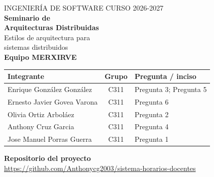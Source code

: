 \begin{titlepage}
\thispagestyle{empty}
\centering
{\color{gris}\small\MakeUppercase{Ingeniería de Software \textperiodcentered{} Curso 2026-2027}}\\[10mm]
{\color{azul}\Huge\bfseries Seminario de\\[2mm] Arquitecturas Distribuidas}\\[6mm]
{\large Estilos de arquitectura para\\ sistemas distribuidos}\\[16mm]
{\color{azul}\LARGE\bfseries Equipo MERXIRVE}\\[12mm]

\renewcommand{\arraystretch}{1.45}
\small
\begin{tabular}{@{}l c p{5.6cm}@{}}
\toprule
\textbf{Integrante} & \textbf{Grupo} & \textbf{Pregunta / inciso} \\
\midrule
Enrique González González   & C311 & Pregunta 3; Pregunta 5 \\
Ernesto Javier Govea Varona & C311 & Pregunta 6 \\
Olivia Ortiz Arboláez       & C311 & Pregunta 2 \\
Anthony Cruz Garcia         & C311 & Pregunta 4 \\
Jose Manuel Porras Guerra   & C311 & Pregunta 1 \\
\bottomrule
\end{tabular}
\normalsize

\vspace{14mm}
{\large\bfseries Repositorio del proyecto}\\[3mm]
\url{https://github.com/Anthonycg2003/sistema-horarios-docentes}
\vfill
\end{titlepage}
